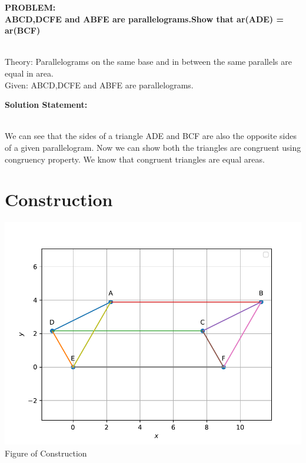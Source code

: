 \documentclass[10pt,a4paper]{report}
\begin{document}
\begin{multicols}{2}

\raggedright \textbf{PROBLEM:}\vspace{2mm}\\
\textbf{ABCD,DCFE and ABFE are parallelograms.Show that   ar(ADE) = ar(BCF)}
\vspace{0.5cm}\raggedright \\
Theory:
Parallelograms on the same base and in between the same parallels are equal in area.\\
Given: ABCD,DCFE and ABFE are parallelograms.
\vspace{2mm} \\ 
\raggedright \textbf{Solution Statement:}\vspace{2mm}
\raggedright \\We can see that the sides of a triangle ADE and BCF are also the opposite sides of a given parallelogram. Now we can show both the triangles are congruent using congruency property. We know that congruent triangles are equal areas.  \\
\vspace{5mm}
\section{Construction}
  \begin{center}
     \includegraphics[scale=0.5]{ABC.pdf} 
     Figure of Construction
   \end{center}
   \vspace{5mm}


\end{multicols}
\end{document}
